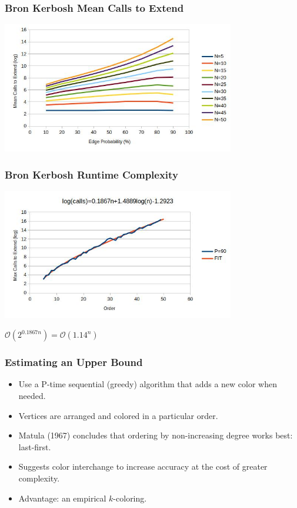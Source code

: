 \documentclass{beamer}
\newcommand{\BO}{\mathcal{O}}
\begin{document}
\begin{frame}
  \frametitle{Bron Kerbosh Mean Calls to Extend}
  \begin{center}
    \includegraphics[width=4in]{../final/bron2_calls}
  \end{center}
\end{frame}

\begin{frame}
  \frametitle{Bron Kerbosh Runtime Complexity}
  \begin{center}
    \includegraphics[width=4in]{../final/bron2_runtime}

    \bigskip

    \(\BO(2^{0.1867n})=\BO(1.14^n)\)
  \end{center}
\end{frame}

\begin{frame}
  \frametitle{Estimating an Upper Bound}
  \begin{itemize}
  \item Use a P-time sequential (greedy) algorithm that adds a new color when needed.
  \item Vertices are arranged and colored in a particular order.
  \item Matula (1967) concludes that ordering by non-increasing degree works best: last-first.
  \item Suggests color interchange to increase accuracy at the cost of greater complexity.
  \item Advantage: an empirical \(k\)-coloring.
  \end{itemize}
\end{frame}
\end{document}
